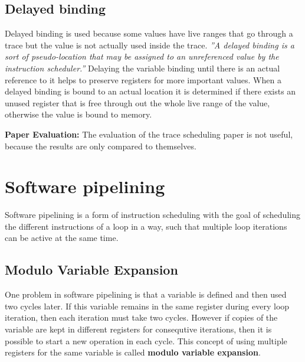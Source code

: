 \documentclass[a4paper,10pt]{article}
\begin{document}
\subsection{Delayed binding}
Delayed binding is used because some values have live ranges that go through a trace but the value is not actually used inside the 
trace. \textit{''A delayed binding is a sort of pseudo-location that may be assigned to an unreferenced value by the instruction 
scheduler.''} Delaying the variable binding until there is an actual reference to it helps to preserve registers for more important 
values. When a delayed binding is bound to an actual location it is determined if there exists an unused register that is free through out 
the whole live range of the value, otherwise the value is bound to memory.

\textbf{Paper Evaluation:} The evaluation of the trace scheduling paper is not useful, because the results are only compared to 
themselves.

\section{Software pipelining}
Software pipelining is a form of instruction scheduling with the goal of scheduling the different instructions of a loop in a way, such 
that multiple loop iterations can be active at the same time.

\subsection{Modulo Variable Expansion}
One problem in software pipelining is that a variable is defined and then used two cycles later. If 
this variable remains in the same register during every loop iteration, then each iteration must take two cycles. However if copies of the 
variable are kept in different registers for consequtive iterations, then it is possible to start a new operation in each cycle. This 
concept of using multiple registers for the same variable is called \textbf{modulo variable expansion}.

\end{document}

